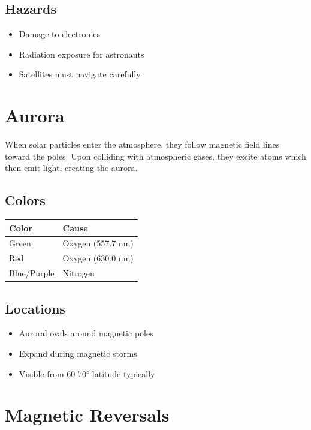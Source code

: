 \documentclass[
  11pt,
  letterpaper,
  twoside,
  openright]{book}
\providecommand{\tightlist}{%
  \setlength{\itemsep}{0pt}\setlength{\parskip}{0pt}}
\begin{document}
\subsection{Hazards}\label{hazards}

\begin{itemize}
\tightlist
\item
  Damage to electronics
\item
  Radiation exposure for astronauts
\item
  Satellites must navigate carefully
\end{itemize}

\section{Aurora}\label{aurora}

When solar particles enter the atmosphere, they follow magnetic field
lines toward the poles. Upon colliding with atmospheric gases, they
excite atoms which then emit light, creating the aurora.

\subsection{Colors}\label{colors}

\begin{longtable}[]{@{}ll@{}}
\toprule\noalign{}
Color & Cause \\
\midrule\noalign{}
\endhead
\bottomrule\noalign{}
\endlastfoot
Green & Oxygen (557.7 nm) \\
Red & Oxygen (630.0 nm) \\
Blue/Purple & Nitrogen \\
\end{longtable}

\subsection{Locations}\label{locations}

\begin{itemize}
\tightlist
\item
  Auroral ovals around magnetic poles
\item
  Expand during magnetic storms
\item
  Visible from 60-70° latitude typically
\end{itemize}

\section{Magnetic Reversals}\label{magnetic-reversals}
\end{document}

